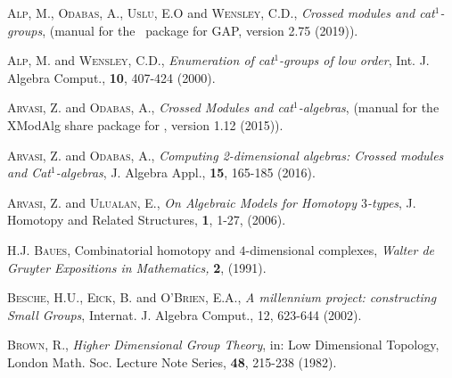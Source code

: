 \documentclass[a4paper,11pt]{article}
\theoremstyle{plain}
\theoremstyle{definition}
\begin{document}
\begin{thebibliography}{99}

	 \textsc{Alp, M.}, \textsc{Odabas, A.}, 
	               \textsc{Uslu, E.O} and \textsc{Wensley, C.D.},   
	\emph{Crossed modules and cat$^{1}$-groups}, 
	{(manual for the \XMod\ package for \textsf{GAP}, version 2.75 (2019))}. 
	
	 \textsc{Alp, M.} and \textsc{Wensley, C.D.}, 
	\emph{Enumeration of cat$^{1}$-groups of low order}, 
	Int. J. Algebra Comput., \textbf{10}, 407-424 (2000).
	
	
	 \textsc{Arvasi, Z.} and \textsc{Odabas, A.},  
	\emph{Crossed Modules and cat$^1$-algebras}, 
	{(manual for the \textsf{XModAlg} share package for \GAP, version 1.12  
	(2015)).} 
	
	 \textsc{Arvasi, Z.} and \textsc{Odabas, A.}, 
	\emph{Computing 2-dimensional algebras: Crossed modules and Cat$^1$-algebras}, 
	J. Algebra Appl., \textbf{15}, 165-185 (2016).
	
	 \textsc{Arvasi, Z.} and \textsc{Ulualan, E.}, 
	\emph{On Algebraic Models for Homotopy $3$-types}, 
	J. Homotopy and Related Structures, \textbf{1}, 1-27, (2006).
		
	
	 \textsc{H.J. Baues}, 
	\textrm{Combinatorial homotopy and $4$-dimensional complexes,} 
	\emph{Walter de Gruyter Expositions in Mathematics,} \textbf{2}, (1991).
	
	
	\textsc{Besche, H.U.}, \textsc{Eick, B.} and \textsc{O'Brien, E.A.}, 
	\emph{A millennium project: constructing Small Groups}, 
	Internat. J. Algebra Comput., 12, 623-644 (2002).
	
	 \textsc{Brown, R.}, 
	\emph{Higher Dimensional Group Theory}, 
	in: Low Dimensional Topology, 
	London Math. Soc. Lecture Note Series, \textbf{48}, 215-238 (1982).
	

\end{thebibliography}
\end{document}
